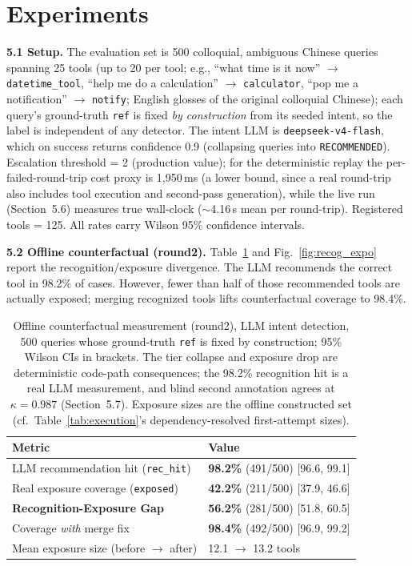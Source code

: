 \section{Experiments}
\label{sec:exp}

\textbf{5.1 Setup.} The evaluation set is 500 colloquial, ambiguous Chinese queries spanning 25 tools (up to 20 per tool; e.g., ``what time is it now'' $\rightarrow$ \texttt{datetime\_tool}, ``help me do a calculation'' $\rightarrow$ \texttt{calculator}, ``pop me a notification'' $\rightarrow$ \texttt{notify}; English glosses of the original colloquial Chinese); each query's ground-truth \texttt{ref} is fixed \emph{by construction} from its seeded intent, so the label is independent of any detector. The intent LLM is \texttt{deepseek-v4-flash}, which on success returns confidence 0.9 (collapsing queries into \texttt{RECOMMENDED}). Escalation threshold = 2 (production value); for the deterministic replay the per-failed-round-trip cost proxy is 1,950\,ms (a lower bound, since a real round-trip also includes tool execution and second-pass generation), while the live run (Section~5.6) measures true wall-clock ($\sim$4.16\,s mean per round-trip). Registered tools = 125. All rates carry Wilson 95\% confidence intervals.

\textbf{5.2 Offline counterfactual (round2).} Table~\ref{tab:offline} and Fig.~\ref{fig:recog_expo} report the recognition/exposure divergence. The LLM recommends the correct tool in 98.2\% of cases. However, fewer than half of those recommended tools are actually exposed; merging recognized tools lifts counterfactual coverage to 98.4\%.

\begin{table}[t]
\caption{Offline counterfactual measurement (round2), LLM intent detection, 500 queries whose ground-truth \texttt{ref} is fixed by construction; 95\% Wilson CIs in brackets. The tier collapse and exposure drop are deterministic code-path consequences; the 98.2\% recognition hit is a real LLM measurement, and blind second annotation agrees at $\kappa=0.987$ (Section~5.7). Exposure sizes are the offline constructed set (cf.\ Table~\ref{tab:execution}'s dependency-resolved first-attempt sizes).}
\label{tab:offline}
\begin{center}
\footnotesize
\begin{tabular}{ll}
\toprule
\textbf{Metric} & \textbf{Value} \\
\midrule
LLM recommendation hit (\texttt{rec\_hit}) & \textbf{98.2\%} (491/500) [96.6, 99.1] \\
Real exposure coverage (\texttt{exposed}) & \textbf{42.2\%} (211/500) [37.9, 46.6] \\
\textbf{Recognition-Exposure Gap} & \textbf{56.2\%} (281/500) [51.8, 60.5] \\
Coverage \emph{with} merge fix & \textbf{98.4\%} (492/500) [96.9, 99.2] \\
Mean exposure size (before $\rightarrow$ after) & 12.1 $\rightarrow$ 13.2 tools \\
\bottomrule
\end{tabular}
\end{center}
\end{table}

